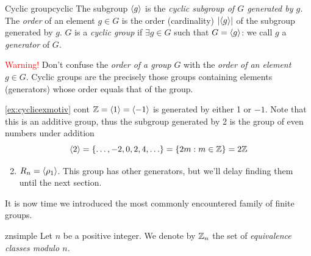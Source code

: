 \begin{defn}{Cyclic group}{cyclic}
The subgroup $\left\langle g\right\rangle$ is the \emph{cyclic subgroup of $G$ generated by $g$.}\smallbreak
The \emph{order} of an element $g\in G$ is the order (cardinality) $\left| \left\langle g\right\rangle\right|$ of the subgroup generated by $g$.\smallbreak
$G$ is a \emph{cyclic group} if $\exists g\in G$ such that $G=\left\langle g\right\rangle$: we call $g$ a \emph{generator} of $G$.
\end{defn}

\textcolor{red}{Warning!} Don't confuse the \emph{order of a group} $G$ with the \emph{order of an element} $g\in G$. Cyclic groups are the precisely those groups containing elements (generators) whose order equals that of the group.

\goodbreak

\begin{examples*}{\ref{ex:cyclicexmotiv} cont}{}
\exstart $\mathbb{Z}=\left\langle 1\right\rangle=\left\langle -1\right\rangle$ is generated by either 1 or $-1$. Note that this is an additive group, thus the subgroup generated by 2 is the group of even numbers under addition
	\[\left\langle 2\right\rangle=\{\ldots,-2,0,2,4,\ldots\}=\{2m:m\in\mathbb{Z}\}=2\mathbb{Z}\]
\begin{enumerate}\setcounter{enumi}{1}
	\item $R_n=\left\langle \rho_1\right\rangle$. This group has other generators, but we'll delay finding them until the next section. %
\end{enumerate}
\end{examples*}
\goodbreak


It is now time we introduced the most commonly encountered family of finite groups.

\begin{defn}{}{znsimple}
Let $n$ be a positive integer. We denote by $\mathbb{Z}_n$ the set of \emph{equivalence classes modulo $n$.}
\end{defn}

